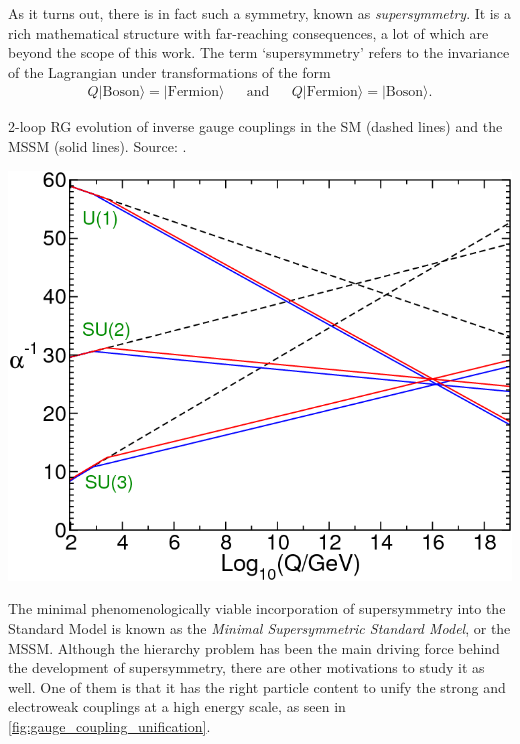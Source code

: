 As it turns out, there is in fact such a symmetry, known as \emph{supersymmetry}. It is a rich mathematical structure with far-reaching consequences, a lot of which are beyond the scope of this work. 
The term `supersymmetry' refers to the invariance of the Lagrangian under transformations of the form%
\begin{align*}
  Q|\text{Boson}\rangle = |\text{Fermion}\rangle &&\text{and}&& Q|\text{Fermion}\rangle = |\text{Boson}\rangle.
\end{align*}
\begin{marginfigure}[-4.5in]
    \caption{2-loop RG evolution of inverse gauge couplings in the SM (dashed lines) and the MSSM (solid lines). Source: \citep{Martin:1997ns}.}
    \includegraphics[width=\textwidth]{images/gauge_coupling_unification}
  \label{fig:gauge_coupling_unification}
\end{marginfigure}
\noindent The minimal phenomenologically viable incorporation of supersymmetry into the Standard Model is known as the \emph{Minimal Supersymmetric Standard Model}, or the MSSM. Although the hierarchy problem has been the main driving force behind the development of supersymmetry, there are other motivations to study it as well.
One of them is that it has the right particle content to unify the strong and electroweak couplings at a high energy scale, as seen in \autoref{fig:gauge_coupling_unification}.

